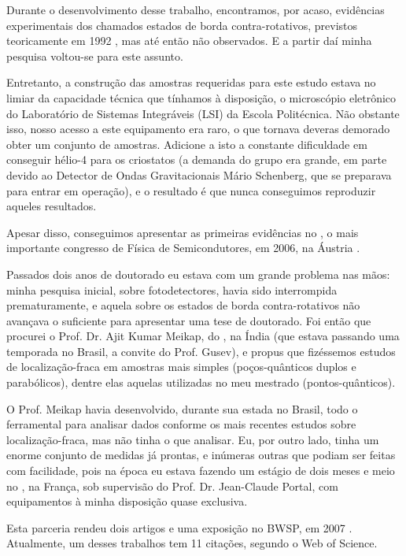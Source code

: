 Durante o desenvolvimento desse trabalho, encontramos, por acaso, evidências experimentais dos chamados estados de borda contra-rotativos, previstos teoricamente em 1992 \cite{johnson-1992}, mas até então não observados. E a partir daí minha pesquisa voltou-se para este assunto.

Entretanto, a construção das amostras requeridas para este estudo estava no limiar da capacidade técnica que tínhamos à disposição, o microscópio eletrônico do Laboratório de Sistemas Integráveis (LSI) da Escola Politécnica. Não obstante isso, nosso acesso a este equipamento era raro, o que tornava deveras demorado obter um conjunto de amostras. Adicione a isto a constante dificuldade em conseguir hélio-4 para os criostatos (a demanda do grupo era grande, em parte devido ao Detector de Ondas Gravitacionais Mário Schenberg, que se preparava para entrar em operação), e o resultado é que nunca conseguimos reproduzir aqueles resultados.

Apesar disso, conseguimos apresentar as primeiras evidências no , o mais importante congresso de Física de Semicondutores, em 2006, na Áustria \cite{pagnossin-2006}.

Passados dois anos de doutorado eu estava com um grande problema nas mãos: minha pesquisa inicial, sobre fotodetectores, havia sido interrompida prematuramente, e aquela sobre os estados de borda contra-rotativos não avançava o suficiente para apresentar uma tese de doutorado. Foi então que procurei o Prof. Dr. Ajit Kumar Meikap, do , na Índia (que estava passando uma temporada no Brasil, a convite do Prof. Gusev), e propus que fizéssemos estudos de localização-fraca em amostras mais simples (poços-quânticos duplos e parabólicos), dentre elas aquelas utilizadas no meu mestrado (pontos-quânticos).

O Prof. Meikap havia desenvolvido, durante sua estada no Brasil, todo o ferramental para analisar dados conforme os mais recentes estudos sobre localização-fraca, mas não tinha o que analisar. Eu, por outro lado, tinha um enorme conjunto de medidas já prontas, e inúmeras outras que podiam ser feitas com facilidade, pois na época eu estava fazendo um estágio de dois meses e meio no , na França, sob supervisão do Prof. Dr. Jean-Claude Portal, com equipamentos à minha disposição quase exclusiva.

Esta parceria rendeu dois artigos \cite{pagnossin-2008-1, pagnossin-2008-2} e uma exposição no  BWSP, em 2007 \cite{pagnossin-2007}. Atualmente, um desses trabalhos tem 11 citações, segundo o Web of Science.

